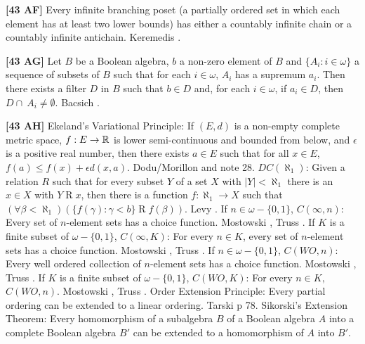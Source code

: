 \smallskip
\item{}{\bf [43 AF]} Every infinite branching poset (a partially ordered
set in which each element has at least two lower bounds) has either a
countably infinite chain or a countably infinite antichain. \ac{Keremedis}
\cite{1999a}.
\smallskip
\item{}{\bf [43 AG]} Let $B$ be a Boolean algebra, $b$ a non-zero element
of $B$ and $\{A_i: i\in\omega\}$ a sequence of subsets of $B$ such that
for each $i\in\omega$, $A_i$ has a supremum $a_i$. Then there exists
a filter $D$ in $B$ such that $b\in D$ and, for each $i\in\omega$,
if $a_i\in D$, then $D\cap\ A_i\neq\emptyset$. \ac{Bacsich} \cite{1972b}.
\smallskip
\item{}{\bf [43 AH]} Ekeland's Variational Principle: If $(E,d)$ is
a non-empty complete metric space, $f: E\to\Bbb R$ is lower
semi-continuous and bounded from below, and $\epsilon$ is a positive
real number, then there exists $a\in E$ such that for all $x\in E$,
$f(a)\le f(x)+\epsilon d(x,a)$.  \ac{Dodu/Morillon} \cite{1999} and
note 28.
\medskip
{} $DC(\aleph _{1})$:  Given a relation $R$ such that
for every  subset $Y$ of a set $X$ with $|Y| < \aleph_{1}$ there
is an $x \in  X$  with $Y \mathrel R x$, then there is a function $f:
\aleph_{1} \rightarrow  X$ such that $(\forall\beta < \aleph_{1})
(\{f(\gamma ): \gamma < b \} \mathrel R f(\beta))$.  \ac{Levy} \cite{1964}.
\medskip
{} If $n\in\omega-\{0,1\}$, $C(\infty,n)$:
Every set of $n$-element sets has a choice function. \ac{Mostowski}
\cite{1945}, \ac{Truss} \cite{1973a}.
\medskip
{} If $K$ is a finite subset of $\omega-\{0,1\}$,
$C(\infty,K)$: For every $n\in K$, every set of $n$-element sets has
a choice function.  \ac{Mostowski} \cite{1945}, \ac{Truss} \cite{1973a}.
\medskip
{}  If $n\in\omega-\{0,1\}$, $C(WO,n)$:
Every well ordered collection of $n$-element sets has a choice function.
\ac{Mostowski} \cite{1945}, \ac{Truss} \cite{1973a}.
\medskip
{} If $K$ is a finite subset of $\omega-\{0,1\}$,
$C(WO,K)$: For every $n\in K,$ $C(WO,n)$. \ac{Mostowski} \cite{1945},
\ac{Truss} \cite{1973a}.
\medskip
{} Order Extension Principle:  Every partial ordering
can be extended to a linear ordering.  \ac{Tarski} \cite{1924} p 78.
\medskip
{}  Sikorski's  Extension Theorem: Every homomorphism
of a subalgebra $B$ of a Boolean algebra $A$ into a complete Boolean
algebra $B'$ can be extended to a homomorphism of $A$ into $B'$.
